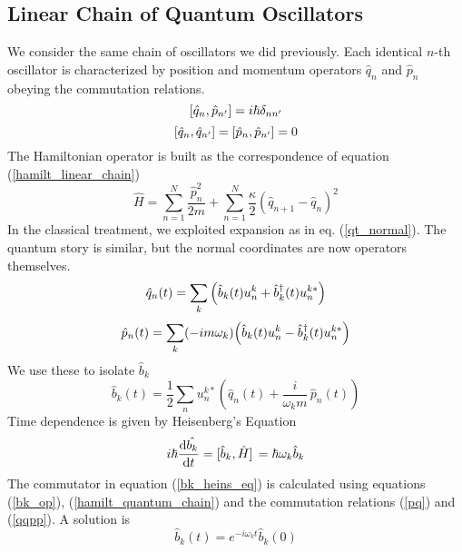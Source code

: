 \subsection{Linear Chain of Quantum Oscillators}
We consider the same chain of oscillators we did previously. Each identical $n$-th oscillator is characterized by position and momentum operators $\hat{q}_n$ and $\hat{p}_n$ obeying the commutation relations.
\begin{equation}
    \comm{\hat{q}_{n}}{\hat{p}_{n^\prime}}={i}\hbar\delta_{nn^\prime}
    \label{pq}
\end{equation}
\begin{equation}
    \comm{\hat{q}_n}{\hat{q}_{n^\prime}}=\comm{\hat{p}_n}{\hat{p}_{n^\prime}}=0
    \label{qqpp}
\end{equation}
The Hamiltonian operator is built as the correspondence of equation (\ref{hamilt_linear_chain})
\begin{equation}
    \hat{H}=\sum_{n=1}^N\frac{\hat{p}_n^2}{2m}+\sum_{n=1}^N\frac{\kappa}{2}(\hat{q}_{n+1}-\hat{q}_{n})^2
    \label{hamilt_quantum_chain}
\end{equation}
In the classical treatment, we exploited expansion as  in eq. (\ref{qt_normal}). The quantum story is similar, but the normal coordinates are now operators themselves. 
\begin{equation}
    \hat{q}_n(t)=\sum_k\qty(\hat{b}_k(t)u_n^k+\hat{b}_k^\dagger(t)u_n^{k*})
\end{equation}
\begin{equation}
    \hat{p}_n(t)=\sum_k(-{i}m\omega_k)\qty(\hat{b}_k(t) u_n^k-\hat{b}_k^\dagger(t) u_n^{k*})
\end{equation}
We use these to isolate $\hat{b}_k$
\begin{equation}
    \hat{b}_k(t)=\frac{1}{2}\sum_n u_n^{k*}\left(\hat{q}_n(t)+\frac{{i}}{\omega_km}\,\hat{p}_n(t)\right)
    \label{bk_op}
\end{equation}
Time dependence is given by Heisenberg's Equation
\begin{equation}
    {i}\hbar\dv{\hat{b_k}}{t}=\comm*{\hat{b}_k}{\hat{H}}=\hbar\omega_k\hat{b}_k
    \label{bk_heins_eq}
\end{equation}
The commutator in equation (\ref{bk_heins_eq}) is calculated using equations (\ref{bk_op}), (\ref{hamilt_quantum_chain}) and the commutation relations (\ref{pq}) and (\ref{qqpp}). A solution is
\begin{equation}
    \hat{b}_k(t)={e}^{{-i}\omega_k t}\hat{b}_k(0)
\end{equation}
